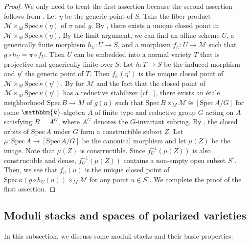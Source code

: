 \documentclass[12pt,twoside]{amsart}
\theoremstyle{definition}
\begin{document}
\begin{proof}
    We only need to treat the first assertion because the second assertion follows from \cite[Theorem A.8]{AHLH}.
    Let $\eta$ be the generic point of $S$. 
    Take the fiber product $\mathcal{M}\times_M\mathrm{Spec}\,\overline{\kappa(\eta)}$ of $\pi$ and $g$. 
    By \cite[Proposition 9.1]{alper}, there exists a unique closed point in $\mathcal{M}\times_M\mathrm{Spec}\,\overline{\kappa(\eta)}$.
    By the limit argument, we can find an affine scheme $U$, a generically finite morphism $h_U\colon U\to S$, and a morphism $f_U\colon U\to \mathcal{M}$ such that $g\circ h_U=\pi\circ f_U$.
   Then $U$ can be embedded into a normal variety $T$ that is projective and generically finite over $S$.
    Let $h\colon T\to S$ be the induced morphism and $\eta'$ the generic point of $T$.
    Then $f_U(\eta')$ is the unique closed point of $\mathcal{M}\times_M\mathrm{Spec}\,\kappa(\eta')$.
    By \cite[Proposition 2.10]{AHLH} for $\mathcal{M}$ and the fact that the closed point of $\mathcal{M}\times_M\mathrm{Spec}\,\kappa(\eta')$ has a reductive stabilizer (cf.~\cite[Proposition 12.14]{alper}), there exists an \'{e}tale neighborhood $\mathrm{Spec}\,B\to M$ of $g(\eta)$ such that $\mathrm{Spec}\,B\times_M\mathcal{M}\cong [\mathrm{Spec}\,A/G]$ for some $\mathbbm{k}$-algebra $A$ of finite type and reductive group $G$ acting on $A$ satisfying $B=A^G$, where $A^G$ denotes the $G$-invariant subring. 
    By \cite[Remark 5 of \S0.2, Amplification 1.3, and the argument in p.~37]{GIT},  the closed orbits of $\mathrm{Spec}\,A$ under $G$ form a constructible subset $Z$. 
    Let $\mu\colon \mathrm{Spec}\,A\to[\mathrm{Spec}\,A/G]$ be the canonical morphism and let $\mu(Z)$ be the image.
    Note that $\mu(Z)$ is constructible.
    Since $f_U^{-1}(\mu(Z))$ is also constructible and dense, $f_U^{-1}(\mu(Z))$ contains a non-empty open subset $S^\circ$.
    Then, we see that $f_U(u)$ is the unique closed point of $\mathrm{Spec}\,\kappa(g\circ h_U(u))\times_{M}\mathcal{M}$ for any point $u\in S^\circ$.
    We complete the proof of the first assertion.
\end{proof}


\subsection{Moduli stacks and spaces of polarized varieties}\label{subsec--moduli-pol}

In this subsection, we discuss some moduli stacks and their basic properties. 
\end{document}
